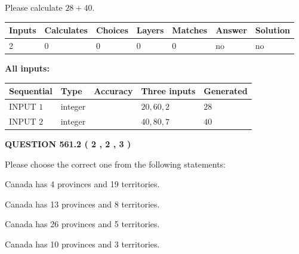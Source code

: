 \documentclass[12pt]{article}
\begin{document}
  
 
Please calculate $ %
28 +  %
40 $.
 
 
   
   
   
   
\noindent\begin{tabular}{|l|l|l|l|l|l|l|}
 \hline
Inputs & Calculates & Choices & Layers & Matches & Answer & Solution \\ \hline
 2  & 
 0  & 
 0
  & 
 0  & 
 0  & 
  no & 
  no 
  \\ \hline
 \end{tabular}
   
   
   
   
\noindent{}
   
   
   
   
\noindent\vspace{0.1in}\hspace{-0.08in} {\textbf{\Large{All inputs: }}}
   
   
  
  
\noindent\begin{tabular}{|l|l|l|l|l|}
\hline
 Sequential & Type & Accuracy & Three inputs & Generated \\ 
\hline
 
 
  INPUT $  1 $ & integer &  & $
 20
 , 
 60
 , 
 2
 $ & $ 28 $ 
 \\  \hline  
 
 
  INPUT $  2 $ & integer &  & $
 40
 , 
 80
 , 
 7
 $ & $ 40 $ 
 \\  \hline  
 \end{tabular}
   
   
  
\vspace{0.2in}
  
{\textbf{\Large{QUESTION
561.2 
 ( 2 , 2 , 3 )
}}}
  
  
Please choose the correct one from the following statements:
 
 
Canada has   4 provinces and  19 territories.
 
 
Canada has  13 provinces and  8 territories.
 
 
Canada has  26 provinces and  5 territories.
 
 
Canada has 10  provinces and 3 territories.
 
\end{document}
